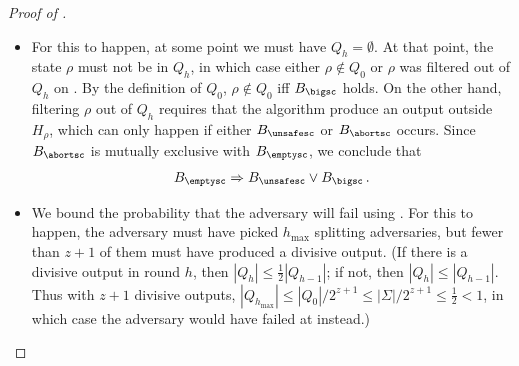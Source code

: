 \begin{itemize}
\begin{itemize}
\begin{proof}[Proof of ]
\begin{itemize}
\begin{itemize}[wide, font=\bfseries]
  \item[(Event $B_{\emptysc}$)~]
    For this to happen, at some point we must have $Q_h = \emptyset$. At that
    point, the state $\rho$ must not be in $Q_h$, in which case either $\rho
    \notin Q_0$ or $\rho$ was filtered out of $Q_h$ on .
    By the definition of $Q_0$, $\rho \notin Q_0$ iff $B_{\bigsc}$ holds. On
    the other hand, filtering $\rho$ out of $Q_h$ requires that the algorithm
    produce an output outside $H_{\rho}$, which can only happen if either
    $B_{\unsafesc}$ or $B_{\abortsc}$ occurs. Since $B_{\abortsc}$ is mutually
    exclusive with $B_{\emptysc}$, we conclude that
    \begin{align}
      B_{\emptysc} \Rightarrow B_{\unsafesc} \lor B_{\bigsc} \,. \label{eq:b-empty-bound}
    \end{align}
  
  \item[(Event $B_{\timeoutsc}$)~]
    We bound the probability that the adversary will fail using
    . For this to
    happen, the adversary must have picked $h_{\max}$ splitting adversaries,
    but fewer than $z+1$ of them must have
    produced a divisive output. (If there is a divisive output in round $h$,
    then $|Q_h| \le \frac{1}{2} |Q_{h-1}|$; if not, then $|Q_h| \le
    |Q_{h-1}|$. Thus with $z+1$ divisive outputs, $|Q_{h_{\max}}| \le |Q_0| /
    2^{z+1} \le |\Sigma|/2^{z+1} \le \frac{1}{2} < 1$, in which case
    the adversary would have failed at  instead.)
  

\end{itemize}
\end{itemize}
\end{proof}
\end{itemize}
\end{itemize}
